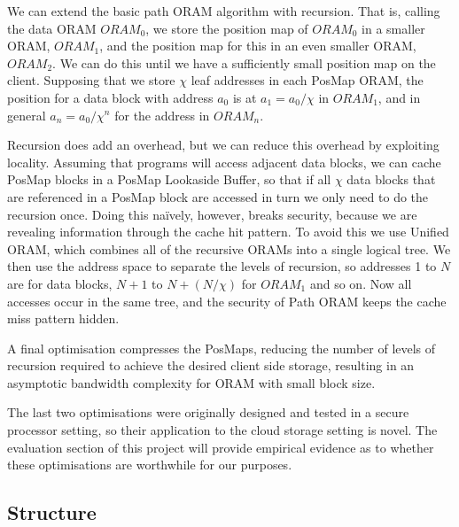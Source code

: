\documentclass[12pt,a4paper,twoside]{article}
\begin{document}

We can extend the basic path ORAM algorithm with recursion. That is, calling the data ORAM $ORAM_0$, we store the position map of $ORAM_0$ in a smaller ORAM, $ORAM_1$, and the position map for this in an even smaller ORAM, $ORAM_2$. We can do this until we have a sufficiently small position map on the client. Supposing that we store $\chi$ leaf addresses in each PosMap ORAM, the position for a data block with address $a_0$ is at $a_1 = a_0 / \chi$ in $ORAM_1$, and in general $a_n = a_0 / \chi^n$ for the address in $ORAM_n$. 





Recursion does add an overhead, but we can reduce this overhead by exploiting locality. Assuming that programs will access adjacent data blocks, we can cache PosMap blocks in a PosMap Lookaside Buffer, so that if all $\chi$ data blocks that are referenced in a PosMap block are accessed in turn we only need to do the recursion once. Doing this na\"ively, however, breaks security, because we are revealing information through the cache hit pattern. To avoid this we use Unified ORAM, which combines all of the recursive ORAMs into a single logical tree. We then use the address space to separate the levels of recursion, so addresses 1 to $N$ are for data blocks, $N + 1$ to $N + (N / \chi)$ for $ORAM_1$ and so on. Now all accesses occur in the same tree, and the security of Path ORAM keeps the cache miss pattern hidden.

A final optimisation compresses the PosMaps, reducing the number of levels of recursion required to achieve the desired client side storage, resulting in an asymptotic bandwidth complexity for ORAM with small block size.

The last two optimisations were originally designed and tested in a secure processor setting, so their application to the cloud storage setting is novel. The evaluation section of this project will provide empirical evidence as to whether these optimisations are worthwhile for our purposes.

\subsection*{Structure}
\end{document}
